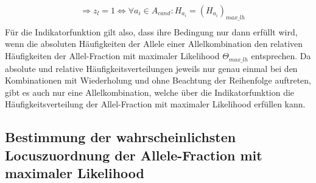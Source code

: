 \begin{center}
{{\begin{beweis}
\begin{equation}
\begin{aligned}
				&\ \Rightarrow z_{l} = 1 \Leftrightarrow \forall a_{i} \in A_{cand} : H_{a_{i}} = (H_{a_{i}})_{max\_lh} \\
				\end{aligned}
				\end{equation}
				Für die Indikatorfunktion gilt also, dass ihre Bedingung nur dann erfüllt wird, wenn die absoluten Häufigkeiten der Allele einer Allelkombination den relativen Häufigkeiten der Allel-Fraction mit maximaler Likelihood $ \Theta_{max\_lh} $ entsprechen. Da absolute und relative Häufigkeitsverteilungen jeweils nur genau einmal bei den Kombinationen mit Wiederholung und ohne Beachtung der Reihenfolge auftreten, gibt es auch nur eine Allelkombination, welche über die Indikatorfunktion die Häufigkeitsverteilung der Allel-Fraction mit maximaler Likelihood erfüllen kann.
			\end{beweis}
	}}
\end{center}

\subsection{Bestimmung der wahrscheinlichsten Locuszuordnung der Allele-Fraction mit maximaler Likelihood} \label{subsec:lh_loci}

